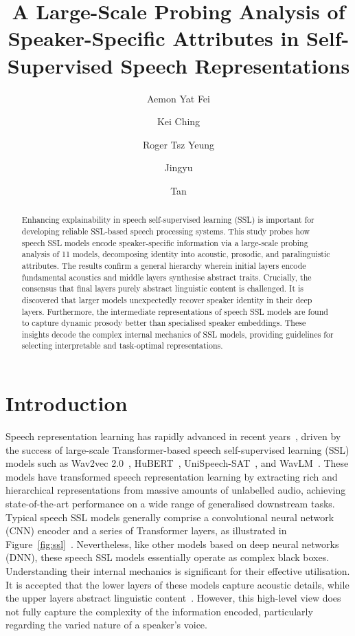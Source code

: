 \documentclass[cameraready]{Interspeech}
\title{A Large-Scale Probing Analysis of Speaker-Specific Attributes in Self-Supervised Speech Representations}
\author[affiliation={\ddagger}, orcid=0009-0005-9672-8147]{Aemon Yat Fei}{Chiu}
\author[affiliation={\ddagger}, orcid=0009-0007-2058-4831]{Kei Ching}{Fung}
\author[affiliation={\ddagger}, orcid=0009-0002-1829-0344]{Roger Tsz Yeung}{Li}
\author[affiliation={\dagger}, orcid=0000-0001-5617-7014]{Jingyu}{Li}
\author[affiliation={\ddagger,\diamond}, orcid=0000-0002-7089-3436]{Tan}{Lee}
\begin{document}
\maketitle

\begin{abstract}
    Enhancing explainability in speech self-supervised learning (SSL) is important for developing reliable SSL-based speech processing systems. This study probes how speech SSL models encode speaker-specific information via a large-scale probing analysis of 11 models, decomposing identity into acoustic, prosodic, and paralinguistic attributes. The results confirm a general hierarchy wherein initial layers encode fundamental acoustics and middle layers synthesise abstract traits. Crucially, the consensus that final layers purely abstract linguistic content is challenged. It is discovered that larger models unexpectedly recover speaker identity in their deep layers. Furthermore, the intermediate representations of speech SSL models are found to capture dynamic prosody better than specialised speaker embeddings. These insights decode the complex internal mechanics of SSL models, providing guidelines for selecting interpretable and task-optimal representations.
\end{abstract}



\section{Introduction}
\label{sec:intro}

Speech representation learning has rapidly advanced in recent years~\cite{ssl, yang2024taslp, wang2024taslp}, driven by the success of large-scale Transformer-based \cite{attention} speech self-supervised learning (SSL) models such as Wav2vec 2.0~\cite{wav2vec2}, HuBERT~\cite{hubert}, UniSpeech-SAT~\cite{unispeech-sat}, and WavLM~\cite{wavlm}. These models have transformed speech representation learning by extracting rich and hierarchical representations from massive amounts of unlabelled audio, achieving state-of-the-art performance on a wide range of generalised downstream tasks. Typical speech SSL models generally comprise a convolutional neural network (CNN) encoder and a series of Transformer layers, as illustrated in Figure~\ref{fig:ssl}~\cite{wav2vec2, hubert, unispeech-sat, wavlm}. Nevertheless, like other models based on deep neural networks (DNN), these speech SSL models essentially operate as complex black boxes. Understanding their internal mechanics is significant for their effective utilisation. It is accepted that the lower layers of these models capture acoustic details, while the upper layers abstract linguistic content~\cite{ssl, yang2024taslp}. However, this high-level view does not fully capture the complexity of the information encoded, particularly regarding the varied nature of a speaker's voice.
\end{document}
